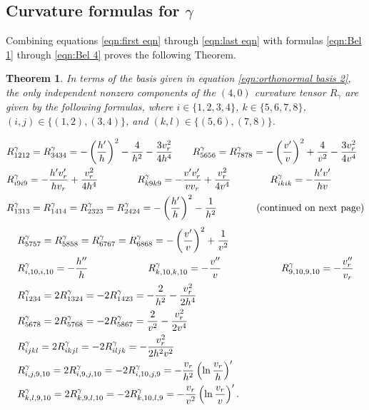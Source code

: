 \documentclass[10pt]{amsart}
\def\g{\gamma}
\newtheorem{theorem}{Theorem}[section]
\theoremstyle{definition}
\theoremstyle{remark}
\numberwithin{equation}{section}
\begin{document}
	
	
	
	
\subsection{Curvature formulas for $\g$}	
Combining equations \eqref{eqn:first eqn} through \eqref{eqn:last eqn} with formulas \eqref{eqn:Bel 1} through \eqref{eqn:Bel 4} proves the following Theorem.

\vskip 20pt

\begin{theorem}\label{thm:curvature tensor 2}
In terms of the basis given in equation \eqref{eqn:orthonormal basis 2}, the only independent nonzero components of the $(4,0)$ curvature tensor $R_{\g}$ are given by the following formulas, where $i \in \{ 1, 2, 3, 4 \}$, $k \in \{ 5, 6, 7, 8 \}$, $( i, j) \in \{ (1, 2), ( 3, 4) \}$, and $(k, l) \in \{ (5, 6), ( 7, 8) \}$.

	\begin{align*}
	&R^{\g}_{1212} = R^{\g}_{3434} = - \left( \frac{h'}{h} \right)^2 - \frac{4}{h^2} - \frac{3 v_r^2}{4h^4}  \hskip 20pt R^{\g}_{5656} = R^{\g}_{7878} = - \left( \frac{v'}{v} \right)^2 + \frac{4}{v^2} - \frac{3v_r^2}{4 v^4}  \\
	&R^{\g}_{i9i9} = - \frac{h' v_r'}{h v_r} + \frac{v_r^2}{4 h^4}   \hskip 40pt	R^{\g}_{k9k9} = - \frac{v' v_r'}{v v_r} + \frac{v_r^2}{4 v^4}	\hskip 40pt	R^{\g}_{ikik} = - \frac{h' v'}{hv}   \\
	&R^{\g}_{1313} = R^{\g}_{1414} = R^{\g}_{2323} = R^{\g}_{2424} = - \left( \frac{h'}{h} \right)^2 - \frac{1}{h^2}  \hskip 40pt	\text{(continued on next page)}
	\end{align*}
	\begin{align*}
	&R^{\g}_{5757} = R^{\g}_{5858} = R^{\g}_{6767} = R^{\g}_{6868} = - \left( \frac{v'}{v} \right)^2 + \frac{1}{v^2}  \\
	&R^{\g}_{i,10,i,10} = - \frac{h''}{h}  \hskip 60pt	R^{\g}_{k,10,k,10} = - \frac{v''}{v} 	\hskip 60pt R^{\g}_{9,10,9,10} = - \frac{v_r''}{v_r}   \\
	&R^{\g}_{1234} = 2R^{\g}_{1324} = -2R^{\g}_{1423} = - \frac{2}{h^2} - \frac{v_r^2}{2h^4}  \\
	&R^{\g}_{5678} = 2R^{\g}_{5768} = -2R^{\g}_{5867} = \frac{2}{v^2} - \frac{v_r^2}{2v^4}  \\
	&R^{\g}_{ijkl} = 2R^{\g}_{ikjl} = -2R^{\g}_{iljk} = - \frac{v_r^2}{2 h^2 v^2}   \\
	&R^{\g}_{i,j,9, 10} = 2R^{\g}_{i,9,j,10} = -2R^{\g}_{i,10,j,9} = - \frac{v_r}{h^2} \left( \ln \frac{v_r}{h} \right)'   \\
	&R^{\g}_{k,l,9,10} = 2R^{\g}_{k,9,l,10} = -2R^{\g}_{k,10,l,9} = - \frac{v_r}{v^2} \left( \ln \frac{v_r}{v} \right)' .
	\end{align*}
\end{theorem}
	
\end{document}
